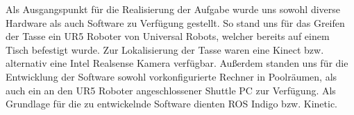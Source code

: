 Als Ausgangspunkt für die Realisierung der Aufgabe wurde uns sowohl diverse Hardware als auch Software zu Verfügung gestellt. So stand uns für das Greifen der Tasse ein UR5 Roboter von Universal Robots, welcher bereits auf einem Tisch befestigt wurde. Zur Lokalisierung der Tasse waren eine Kinect bzw. alternativ eine Intel Realsense Kamera verfügbar. Außerdem standen uns für die Entwicklung der Software sowohl vorkonfigurierte Rechner in Poolräumen, als auch ein an den UR5 Roboter angeschlossener Shuttle PC zur Verfügung. Als Grundlage für die zu entwickelnde Software dienten ROS Indigo bzw. Kinetic.